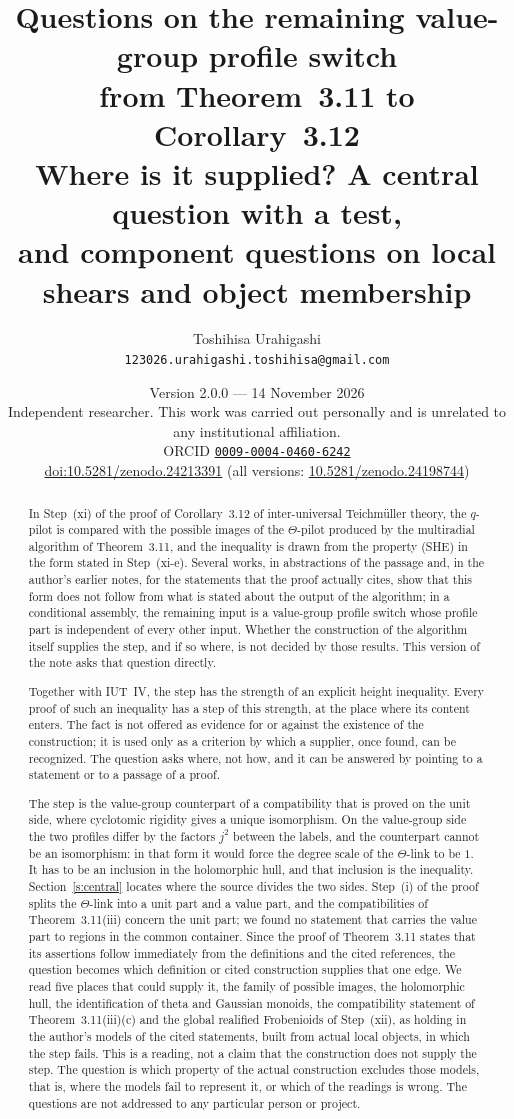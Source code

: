 \documentclass[11pt]{article}
\title{Questions on the remaining value-group profile switch\\
from Theorem~3.11 to Corollary~3.12\\[4pt]
\large Where is it supplied? A central question with a test,\\
and component questions on local shears and object membership}
\author{Toshihisa Urahigashi\\
\small\texttt{123026.urahigashi.toshihisa@gmail.com}}
\date{Version 2.0.0 --- 14 November 2026\\[3pt]
\small Independent researcher. This work was carried out personally and is
unrelated to any institutional affiliation.\\[3pt]
\small ORCID \href{https://orcid.org/0009-0004-0460-6242}{\texttt{0009-0004-0460-6242}}\\[-2pt]
\small \href{https://doi.org/10.5281/zenodo.24213391}{doi:10.5281/zenodo.24213391} (all versions: \href{https://doi.org/10.5281/zenodo.24198744}{10.5281/zenodo.24198744})}
\theoremstyle{definition}
\begin{document}
\maketitle

\begin{abstract}
In Step~(xi) of the proof of Corollary~3.12 of inter-universal
Teichm\"uller theory, the $q$-pilot is compared with the possible
images of the $\Theta$-pilot produced by the multiradial algorithm
of Theorem~3.11, and the inequality is drawn from the property
(SHE) in the form stated in Step~(xi-e).  Several works, in
abstractions of the passage and, in the author's earlier notes, for
the statements that the proof actually cites, show that this form
does not follow from what is stated about the output of the
algorithm; in a conditional assembly, the remaining input is a
value-group profile switch whose profile part is independent of
every other input.  Whether the construction of the algorithm
itself supplies the step, and if so where, is not decided by those
results.  This version of the note asks that question directly.

Together with IUT~IV, the step has the strength of an explicit
height inequality.  Every proof of such an inequality has a step of
this strength, at the place where its content enters.  The fact is
not offered as evidence for or against the existence of the
construction; it is used only as a criterion by which a supplier,
once found, can be recognized.  The question asks where, not how,
and it can be answered by pointing to a statement or to a passage
of a proof.

The step is the value-group counterpart of a compatibility that is
proved on the unit side, where cyclotomic rigidity gives a unique
isomorphism.  On the value-group side the two profiles differ by the
factors $j^2$ between the labels, and the counterpart cannot be an
isomorphism: in that form it would force the degree scale of the
$\Theta$-link to be $1$.  It has to be an inclusion in the
holomorphic hull, and that inclusion is the inequality.
Section~\ref{s:central} locates where the source divides the two
sides.  Step~(i) of the proof splits the $\Theta$-link into a unit
part and a value part, and the compatibilities of Theorem~3.11(iii)
concern the unit part; we found no statement that carries the value
part to regions in the common container.  Since the proof of
Theorem~3.11 states that its assertions follow immediately from the
definitions and the cited references, the question becomes which
definition or cited construction supplies that one edge.  We read
five places that could supply it, the family of possible images,
the holomorphic hull, the identification of theta and Gaussian
monoids, the compatibility statement of Theorem~3.11(iii)(c) and the
global realified Frobenioids of Step~(xii), as holding in the
author's models of the cited statements, built from actual local
objects, in which the step fails.  This is a reading, not a claim
that the construction does not supply the step.  The question is
which property of the actual construction excludes those models,
that is, where the models fail to represent it, or which of the
readings is wrong.  The questions are not addressed to any particular person
or project.


\end{abstract}
\end{document}
